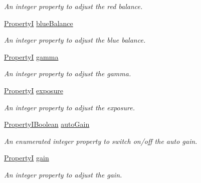 \begin{DoxyCompactItemize}
\begin{DoxyCompactList}\small\item\em An integer property to adjust the red balance. \end{DoxyCompactList}\item 
\hyperlink{group___common_interface_ga12d5e434238ca242a1ba4c6c3ea45780}{Property\+I} \hyperlink{classmv_i_m_p_a_c_t_1_1acquire_1_1_camera_settings_v4_l2_device_a45a31558e0487169e66763231ed41434}{blue\+Balance}
\begin{DoxyCompactList}\small\item\em An integer property to adjust the blue balance. \end{DoxyCompactList}\item 
\hyperlink{group___common_interface_ga12d5e434238ca242a1ba4c6c3ea45780}{Property\+I} \hyperlink{classmv_i_m_p_a_c_t_1_1acquire_1_1_camera_settings_v4_l2_device_ac5c2d70d509d427ceba37d2d179736e3}{gamma}
\begin{DoxyCompactList}\small\item\em An integer property to adjust the gamma. \end{DoxyCompactList}\item 
\hyperlink{group___common_interface_ga12d5e434238ca242a1ba4c6c3ea45780}{Property\+I} \hyperlink{classmv_i_m_p_a_c_t_1_1acquire_1_1_camera_settings_v4_l2_device_a35d158bd71d3210bb08f828a8a3f8295}{exposure}
\begin{DoxyCompactList}\small\item\em An integer property to adjust the exposure. \end{DoxyCompactList}\item 
\hyperlink{group___common_interface_ga44f9437e24b21b6c93da9039ec6786aa}{Property\+I\+Boolean} \hyperlink{classmv_i_m_p_a_c_t_1_1acquire_1_1_camera_settings_v4_l2_device_a27d47ba5c43a2c52451d16e66aa65f42}{auto\+Gain}
\begin{DoxyCompactList}\small\item\em An enumerated integer property to switch on/off the auto gain. \end{DoxyCompactList}\item 
\hyperlink{group___common_interface_ga12d5e434238ca242a1ba4c6c3ea45780}{Property\+I} \hyperlink{classmv_i_m_p_a_c_t_1_1acquire_1_1_camera_settings_v4_l2_device_a3264adc428c3d0c9c8987ce06b3adfdb}{gain}
\begin{DoxyCompactList}\small\item\em An integer property to adjust the gain. \end{DoxyCompactList}\item 

\end{DoxyCompactItemize}
